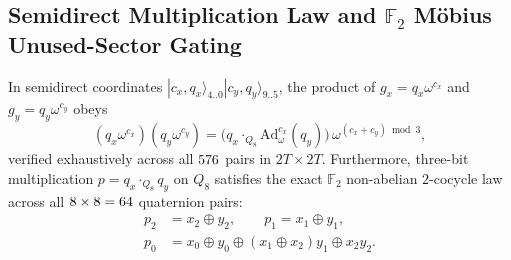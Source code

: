 \documentclass[aps,prx,twocolumn,superscriptaddress,nofootinbib]{revtex4-2}
\begin{document}
\subsection{Semidirect Multiplication Law and $\mathbb{F}_2$ M\"obius Unused-Sector Gating}
In semidirect coordinates $|c_x, q_x\rangle_{4..0}|c_y, q_y\rangle_{9..5}$, the product of $g_x = q_x \omega^{c_x}$ and $g_y = q_y \omega^{c_y}$ obeys
\begin{equation}
  (q_x \omega^{c_x})(q_y \omega^{c_y})
  = \bigl(q_x \cdot_{Q_8} \mathrm{Ad}_\omega^{c_x}(q_y)\bigr)\, \omega^{(c_x + c_y) \bmod 3},
  \label{eq:semidirect_law}
\end{equation}
verified exhaustively across all $576$ pairs in $2T \times 2T$. Furthermore, three-bit multiplication $p = q_x \cdot_{Q_8} q_y$ on $Q_8$ satisfies the exact $\mathbb{F}_2$ non-abelian $2$-cocycle law across all $8 \times 8 = 64$ quaternion pairs:
\begin{align}
  p_2 &= x_2 \oplus y_2, \qquad p_1 = x_1 \oplus y_1, \nonumber\\
  p_0 &= x_0 \oplus y_0 \oplus (x_1 \oplus x_2)y_1 \oplus x_2 y_2.
  \label{eq:q8_cocycle}
\end{align}
\end{document}
